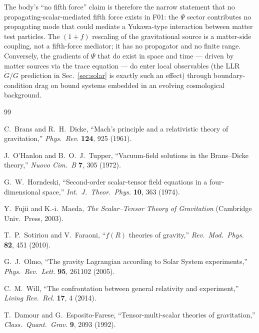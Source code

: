 \documentclass[aps,prd,twocolumn,nofootinbib,floatfix,superscriptaddress]{revtex4-2}
\begin{document}
The body's ``no fifth force'' claim is therefore the narrow
statement that no propagating-scalar-mediated fifth force exists
in F01: the $\Psi$ sector contributes no propagating mode that
could mediate a Yukawa-type interaction between matter test
particles. The $(1+f)$ rescaling of the gravitational source is a
matter-side coupling, not a fifth-force mediator; it has no
propagator and no finite range. Conversely, the gradients of
$\Psi$ that do exist in space and time --- driven by matter sources
via the trace equation --- do enter local observables (the LLR
$\dot G/G$ prediction in Sec.~\ref{sec:solar} is exactly such an
effect) through boundary-condition drag on bound systems embedded
in an evolving cosmological background.

\begin{thebibliography}{99}


 C.~Brans and R.~H.~Dicke, ``Mach's
principle and a relativistic theory of gravitation,''
\textit{Phys.~Rev.} \textbf{124}, 925 (1961).

 J.~O'Hanlon and B.~O.~J.~Tupper,
``Vacuum-field solutions in the Brans--Dicke theory,''
\textit{Nuovo Cim.~B} \textbf{7}, 305 (1972).

 G.~W.~Horndeski, ``Second-order scalar-tensor
field equations in a four-dimensional space,''
\textit{Int.~J.~Theor.~Phys.} \textbf{10}, 363 (1974).

 Y.~Fujii and K.-i.~Maeda, \textit{The
Scalar--Tensor Theory of Gravitation} (Cambridge Univ.~Press, 2003).

 T.~P.~Sotiriou and V.~Faraoni, ``$f(R)$
theories of gravity,'' \textit{Rev.~Mod.~Phys.} \textbf{82}, 451
(2010).

 G.~J.~Olmo, ``The gravity Lagrangian according to
Solar System experiments,'' \textit{Phys.~Rev.~Lett.} \textbf{95},
261102 (2005).

 C.~M.~Will, ``The confrontation between general
relativity and experiment,'' \textit{Living Rev.~Rel.} \textbf{17},
4 (2014).

 T.~Damour and G.~Esposito-Farese,
``Tensor-multi-scalar theories of gravitation,''
\textit{Class.~Quant.~Grav.} \textbf{9}, 2093 (1992).


\end{thebibliography}
\end{document}
